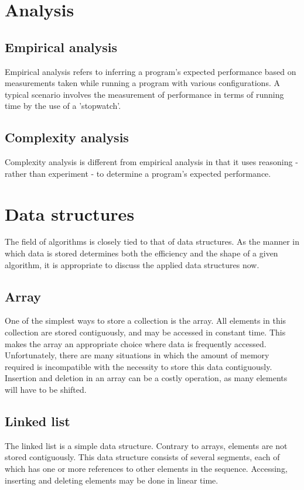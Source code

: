 \documentclass{article}
\begin{document}
\newpage

\section{Analysis}
\subsection{Empirical analysis}
Empirical analysis refers to inferring a program's expected performance based on measurements taken while running a program with various configurations.
A typical scenario involves the measurement of performance in terms of running time by the use of a 'stopwatch'.

\subsection{Complexity analysis}
Complexity analysis is different from empirical analysis in that it uses reasoning
- rather than experiment - to determine a program's expected performance.

\newpage

\section{Data structures}
The field of algorithms is closely tied to that of data structures. As the manner in which data is stored determines both the efficiency and the shape of a given algorithm, it is appropriate to discuss the applied data structures now.

\subsection{Array}
One of the simplest ways to store a collection is the array. All elements in this collection are stored contiguously,
and may be accessed in constant time. This makes the array an appropriate choice where data is frequently accessed.
Unfortunately, there are many situations in which the amount of memory required is incompatible with the necessity
to store this data contiguously. Insertion and deletion in an array can be a costly operation, as many elements will have to be shifted.

\subsection{Linked list}
The linked list is a simple data structure. Contrary to arrays, elements are not stored contiguously.
This data structure consists of several segments, each of which has one or more references to other elements in the sequence.
Accessing, inserting and deleting elements may be done in linear time.
\end{document}
